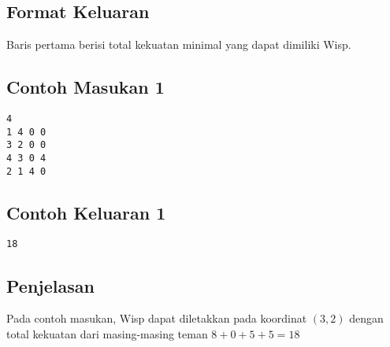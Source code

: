 \documentclass{article}
\begin{document}
\subsection*{Format Keluaran}
Baris pertama berisi total kekuatan minimal yang dapat dimiliki Wisp.

\begin{multicols}{2}
\subsection*{Contoh Masukan 1}
\begin{lstlisting}
4
1 4 0 0
3 2 0 0
4 3 0 4
2 1 4 0
\end{lstlisting}
\null
\columnbreak
\subsection*{Contoh Keluaran 1}
\begin{lstlisting}
18
\end{lstlisting}
\vfill
\null
\end{multicols}


\subsection*{Penjelasan}
Pada contoh masukan, Wisp dapat diletakkan pada koordinat $(3, 2)$ dengan total kekuatan dari masing-masing teman $8 + 0 + 5 + 5 = 18$
\end{document}
